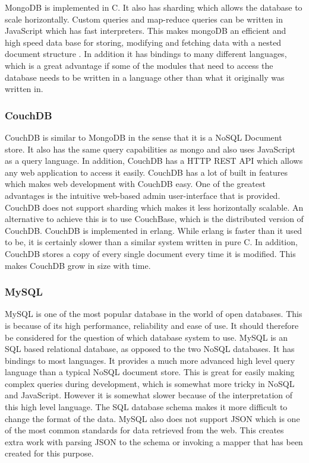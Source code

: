 MongoDB is implemented in C. It also has sharding which allows the database to scale horizontally. Custom queries and map-reduce queries can be written in JavaScript which has fast interpreters. This makes mongoDB an efficient and high speed data base for storing, modifying and fetching data with a nested document structure \cite{mongodb-intro}. In addition it has bindings to many different languages, which is a great advantage if some of the modules that need to access the database needs to be written in a language other than what it originally was written in.


\subsubsection*{CouchDB}
CouchDB is similar to MongoDB in the sense that it is a NoSQL Document store. It also has the same query capabilities as mongo and also uses JavaScript as a query language. In addition, CouchDB has a HTTP REST API which allows any web application to access it easily. CouchDB has a lot of built in features which makes web development with CouchDB easy. One of the greatest advantages is the intuitive web-based admin user-interface that is provided.
CouchDB does not support sharding which makes it less horizontally scalable. An alternative to achieve this is to use CouchBase, which is the distributed version of CouchDB. CouchDB is implemented in erlang. While erlang is faster than it used to be, it is certainly slower than a similar system written in pure C. In addition, CouchDB stores a copy of every single document every time it is modified. This makes CouchDB grow in size with time.
\cite{couchdb-about, couchdb-technical}


\subsubsection*{MySQL}
MySQL is one of the most popular database in the world of open databases. This is because of its high performance, reliability and ease of use. It should therefore be considered for the question of which database system to use. MySQL is an SQL based relational database, as opposed to the two NoSQL databases. It has bindings to most languages. It provides a much more advanced high level query language than a typical NoSQL document store. This is great for easily making complex queries during development, which is somewhat more tricky in NoSQL and JavaScript. However it is somewhat slower because of the interpretation of this high level language. The SQL database schema makes it more difficult to change the format of the data. MySQL also does not support JSON which is one of the most common standards for data retrieved from the web. This creates extra work with parsing JSON to the schema or invoking a mapper that has been created for this purpose.
\cite{mysql-about}


